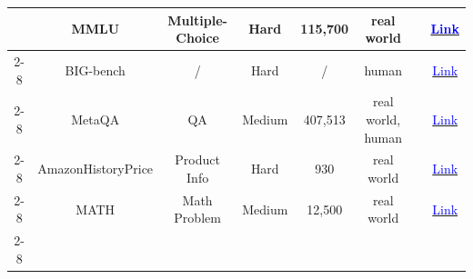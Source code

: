 \begin{table}[!htp]
{\begin{tabular}{c|c|c|c|c|c|c|c}
                                                                                  & MMLU                   & Multiple-Choice         & Hard                & 115,700          & real world          & \cite{du2023improving,tang2023medagents,tan2024true,yukhymenko2024synthetic,zhang2023exploring} & \href{https://github.com/hendrycks/test}{\textcolor{blue}{Link}}                                                                                                  \\ \cline{2-8}
                                                                                  & BIG-bench              & /                       & Hard                & /                & human               & \cite{du2023improving,chen2023agentverse,zhang2023exploring}                                                        & \href{https://github.com/google/BIG-bench}{\textcolor{blue}{Link}}                                                                                                \\ \cline{2-8}
                                                                                  & MetaQA                 & QA                      & Medium              & 407,513          & real world, human   & \cite{ma2024debate}                                                                                                                                                             & \href{https://github.com/yuyuz/MetaQA}{\textcolor{blue}{Link}}                                                                                                    \\ \cline{2-8}
                                                                                  & AmazonHistoryPrice     & Product Info            & Hard                & 930              & real world          & \cite{xia2024measuring}                                                                                                                                                         & \href{https://github.com/TianXiaSJTU/AmazonPriceHistory}{\textcolor{blue}{Link}}                                                                                  \\ \cline{2-8}
                                                                                  & MATH                   & Math Problem            & Medium              & 12,500           & real world          & \cite{wu2023autogen}                                                                                                                                                            & \href{https://github.com/hendrycks/math/}{\textcolor{blue}{Link}}                                                                                                 \\ \cline{2-8}

\end{tabular}}
\end{table}
